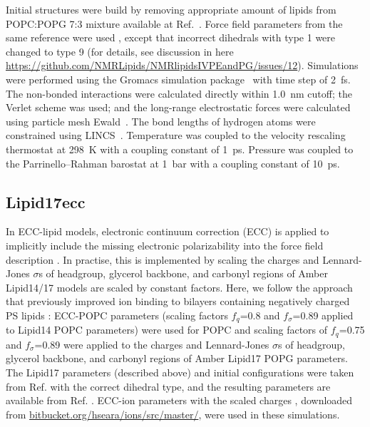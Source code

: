 \documentclass[journal=jpcbfk]{achemso}
\begin{document}
 

Initial structures were build by removing appropriate amount of lipids from POPC:POPG 7:3 mixture available at Ref.~\cite{POPCPOPG73lipid17}.
Force field parameters from the same reference were used ,
except that incorrect dihedrals with type 1 were changed to type 9
(for details, see discussion in here \url{https://github.com/NMRLipids/NMRlipidsIVPEandPG/issues/12}).
Simulations were performed using the Gromacs simulation package~\cite{pall20} with time step of 2~fs. 
The non-bonded interactions were calculated directly within 1.0~nm cutoff; the Verlet scheme was used\cite{Pall13};
and the long-range electrostatic forces were calculated using particle mesh Ewald~\cite{essman95}. 
The bond lengths of hydrogen atoms were constrained using LINCS~\cite{hess97}.
Temperature was coupled to the velocity rescaling thermostat \cite{bussi07} at 298~K with a coupling constant of 1~ps.
Pressure was coupled to the Parrinello--Rahman barostat \cite{parrinello81} at 1~bar with a coupling constant of 10~ps. 



\subsection{Lipid17ecc}

In ECC-lipid models, electronic continuum correction (ECC) is applied to 
implicitly include the missing electronic polarizability into the force field description \cite{melcr18,melcr19}.
In practise, this is implemented by scaling the charges and Lennard-Jones $\sigma$s of headgroup, glycerol backbone, and carbonyl regions
of Amber Lipid14/17 models are scaled by constant factors.
Here, we follow the approach that previously improved ion binding to bilayers containing negatively charged PS lipids \cite{melcr19}:
ECC-POPC parameters (scaling factors $f_q$=0.8 and $f_\sigma$=0.89 applied to Lipid14 POPC parameters) \cite{melcr18} were used for POPC
and scaling factors of $f_q$=0.75 and $f_\sigma$=0.89 were applied to the charges and Lennard-Jones $\sigma$s of headgroup, glycerol backbone, and carbonyl regions
of Amber Lipid17 POPG parameters. The Lipid17 parameters (described above) and initial configurations
were taken from Ref. \cite{POPGlipid17} with the correct dihedral type,
and the resulting parameters are available from Ref. . ECC-ion parameters with the scaled charges \cite{pluharova14,kohagen16,martinek18},
downloaded from \url{bitbucket.org/hseara/ions/src/master/}, were used in these simulations. 





\clearpage

\end{document}
